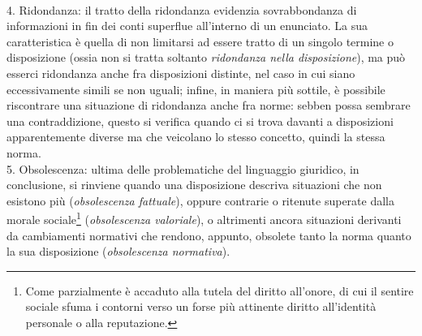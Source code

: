 \\4. Ridondanza: il tratto della ridondanza evidenzia sovrabbondanza di informazioni in fin dei conti superflue all'interno di un enunciato. La sua caratteristica è quella di non limitarsi ad essere tratto di un singolo termine o disposizione (ossia non si tratta soltanto \textit{ridondanza nella disposizione}), ma può esserci ridondanza anche fra disposizioni distinte, nel caso in cui siano eccessivamente simili se non uguali; infine, in maniera più sottile, è possibile riscontrare una situazione di ridondanza anche fra norme: sebben possa sembrare una contraddizione, questo si verifica quando ci si trova davanti a disposizioni apparentemente diverse ma che veicolano lo stesso concetto, quindi la stessa norma.
\\5. Obsolescenza: ultima delle problematiche del linguaggio giuridico, in conclusione, si rinviene quando una disposizione descriva situazioni che non esistono più (\textit{obsolescenza fattuale}), oppure contrarie o ritenute superate dalla morale sociale\footnote{Come parzialmente è accaduto alla tutela del diritto all'onore, di cui il sentire sociale sfuma i contorni verso un forse più attinente diritto all'identità personale o alla reputazione.} (\textit{obsolescenza valoriale}), o altrimenti ancora situazioni derivanti da cambiamenti normativi che rendono, appunto, obsolete tanto la norma quanto la sua disposizione (\textit{obsolescenza normativa}).

